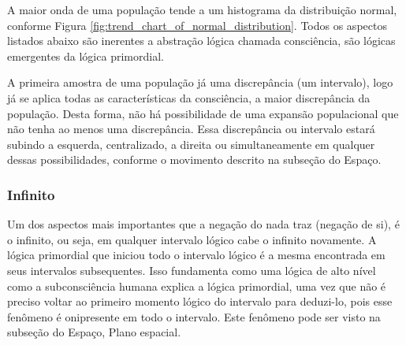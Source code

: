 A maior onda de uma população tende a um histograma da distribuição normal, conforme Figura \ref{fig:trend_chart_of_normal_distribution}. Todos os aspectos listados abaixo são inerentes a abstração lógica chamada consciência, são lógicas emergentes da lógica primordial.

A primeira amostra de uma população já uma discrepância (um intervalo), logo já se aplica todas as características da consciência, a maior discrepância da população. Desta forma, não há possibilidade de uma expansão populacional que não tenha ao menos uma discrepância. Essa discrepância ou intervalo estará subindo a esquerda, centralizado, a direita ou simultaneamente em qualquer dessas possibilidades, conforme o movimento descrito na subseção do Espaço.

\subsubsection{Infinito}
Um dos aspectos mais importantes que a negação do nada traz (negação de si), é o infinito, ou seja, em qualquer intervalo lógico cabe o infinito novamente. A lógica primordial que iniciou todo o intervalo lógico é a mesma encontrada em seus intervalos subsequentes. Isso fundamenta como uma lógica de alto nível como a subconsciência humana explica a lógica primordial, uma vez que não é preciso voltar ao primeiro momento lógico do intervalo para deduzi-lo, pois esse fenômeno é onipresente em todo o intervalo. Este fenômeno pode ser visto na subseção do Espaço, Plano espacial.

